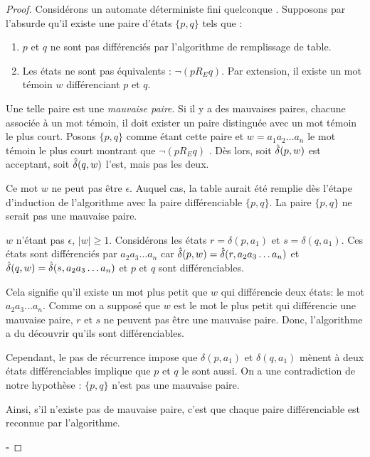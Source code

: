 \begin{proof}

Considérons un automate déterministe fini quelconque \automaton. Supposons par l'absurde qu'il existe une paire d'états $\{p,q\}$ tels que :
\begin{enumerate}
	 \item $p$ et $q$ ne sont pas différenciés par l'algorithme de remplissage de table.
	 \item Les états ne sont pas équivalents : $\neg (pR_E q)$. Par extension, il existe un mot témoin $w$ différenciant $p$ et $q$.
\end{enumerate}

Une telle paire est une \emph{mauvaise paire}. Si il y a des mauvaises paires, chacune associée à un mot témoin, il doit exister un paire distinguée avec un mot témoin le plus court. Posons $\{p,q\}$ comme étant cette paire et $w=a_1a_2\dots a_n$ le mot témoin le plus court montrant que $\neg (pR_E q)$ . Dès lors, soit $\hat{\delta}(p,w)$ est acceptant, soit $\hat{\delta}(q,w)$ l'est, mais pas les deux.

Ce mot $w$ ne peut pas être $\epsilon$. Auquel cas, la table aurait été remplie dès l'étape d'induction de l'algorithme avec la paire différenciable $\{p,q\}$. La paire $\{p,q\}$ ne serait pas une mauvaise paire.

$w$ n'étant pas $\epsilon$, $ |w| \ge 1$. Considérons les états $r = \delta(p,a_1)$ et $s=\delta(q,a_1)$. Ces états sont différenciés par $a_2a_3\dots a_n$ car $\hat{\delta}(p,w) = \hat{\delta}(r, a_2a_3\dots a_n)$ et $\hat{\delta}(q,w) = \hat{\delta}(s, a_2a_3\dots a_n)$ et $p$ et $q$ sont différenciables.

Cela signifie qu'il existe un mot plus petit que $w$ qui différencie deux états: le mot $a_2a_3\dots a_n$. Comme on a supposé que $w$ est le mot le plus petit qui différencie une mauvaise paire, $r$ et $s$ ne peuvent pas être une mauvaise paire. Donc, l'algorithme a du découvrir qu'ils sont différenciables.

Cependant, le pas de récurrence impose que $\delta(p, a_1)$ et $\delta(q, a_1)$ mènent à deux états différenciables implique que $p$ et $q$ le sont aussi. On a une contradiction de notre hypothèse : $\{p,q\}$ n'est pas une mauvaise paire.

Ainsi, s'il n'existe pas de mauvaise paire, c'est que chaque paire différenciable est reconnue par l'algorithme.

\hfill$\square$
\end{proof}


